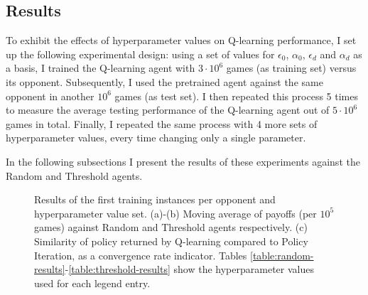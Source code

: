 \subsection{Results}

To exhibit the effects of hyperparameter values on Q-learning performance, I set up the following experimental design: using a set of values for $\epsilon_0$, $\alpha_0$, $\epsilon_d$ and $\alpha_d$ as a basis, I trained the Q-learning agent with $3\cdot10^6$ games (as training set) versus its opponent. Subsequently, I used the pretrained agent against the same opponent in another $10^6$ games (as test set). I then repeated this process 5 times to measure the average testing performance of the Q-learning agent out of $5\cdot10^6$ games in total. Finally, I repeated the same process with 4 more sets of hyperparameter values, every time changing only a single parameter.

In the following subsections I present the results of these experiments against the Random and Threshold agents.

\begin{figure}[htpb]
\renewcommand*\thesubfigure{\alph{subfigure}}
\centering
\caption{Results of the first training instances per opponent and hyperparameter value set. (a)-(b) Moving average of payoffs (per $10^5$ games) against Random and Threshold agents respectively. (c) Similarity of policy returned by Q-learning compared to Policy Iteration, as a convergence rate indicator. Tables \ref{table:random-results}-\ref{table:threshold-results} show the hyperparameter values used for each legend entry.
}
\label{fig:1}
\end{figure}

